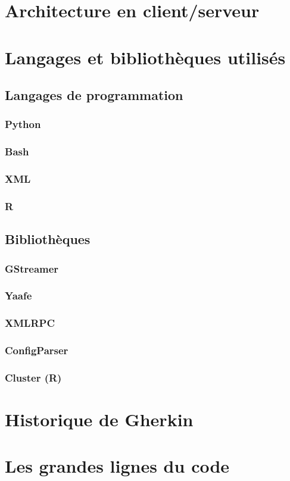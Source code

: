 \documentclass{report}
\begin{document}
\chapter{Architecture en client/serveur}


\chapter{Langages et bibliothèques utilisés}

\section{Langages de programmation}
\subsection{Python}

\subsection{Bash}

\subsection{XML}

\subsection{R}

\section{Bibliothèques}

\subsection{GStreamer}

\subsection{Yaafe}

\subsection{XMLRPC}

\subsection{ConfigParser}

\subsection{Cluster (R)}

\chapter{Historique de Gherkin}


\chapter{Les grandes lignes du code}
\end{document}
